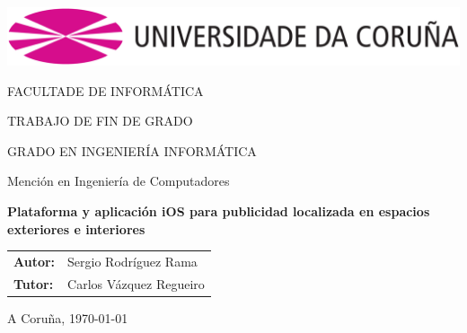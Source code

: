 \begin{titlepage}
\begin{center}

\includegraphics[scale=0.4]{figures/udc.eps}

\vspace*{1cm}


\Huge{FACULTADE DE INFORMÁTICA}


\vspace*{1cm}

\Large{TRABAJO DE FIN DE GRADO}

\Large{GRADO EN INGENIERÍA INFORMÁTICA}

\vspace*{1cm}

Mención en Ingeniería de Computadores

\vspace*{2cm}

\textbf{\LARGE{Plataforma y aplicación iOS para publicidad localizada en espacios exteriores e interiores}}

\end{center}


\vspace*{4cm}


\begin{flushright}

\begin{tabular}{ll}
\textbf{Autor:}& Sergio Rodríguez Rama \\
\textbf{Tutor: }& Carlos Vázquez Regueiro \\

\end{tabular}
\end{flushright}

\vspace*{0.5cm}

\begin{flushright}

A Coruña, \today

\end{flushright}

\end{titlepage}
